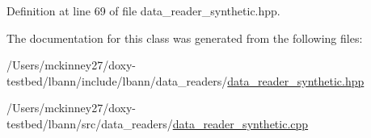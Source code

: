 Definition at line 69 of file data\+\_\+reader\+\_\+synthetic.\+hpp.



The documentation for this class was generated from the following files\+:\begin{DoxyCompactItemize}
\item 
/\+Users/mckinney27/doxy-\/testbed/lbann/include/lbann/data\+\_\+readers/\hyperlink{data__reader__synthetic_8hpp}{data\+\_\+reader\+\_\+synthetic.\+hpp}\item 
/\+Users/mckinney27/doxy-\/testbed/lbann/src/data\+\_\+readers/\hyperlink{data__reader__synthetic_8cpp}{data\+\_\+reader\+\_\+synthetic.\+cpp}\end{DoxyCompactItemize}
